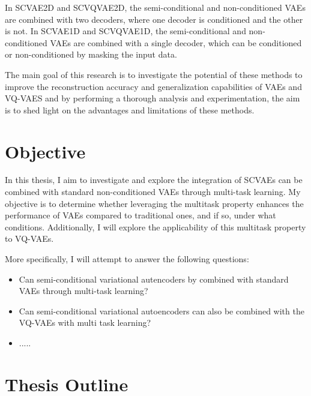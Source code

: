 In SCVAE2D and SCVQVAE2D, the semi-conditional and non-conditioned VAEs are combined with two decoders, where one decoder is conditioned and the other is not. In SCVAE1D and SCVQVAE1D, the semi-conditional and non-conditioned VAEs are combined with a single decoder, which can be conditioned or non-conditioned by masking the input data.

The main goal of this research is to investigate the potential of these methods to improve the reconstruction accuracy and generalization capabilities of VAEs and VQ-VAES and by performing a thorough analysis and experimentation, the aim is to shed light on the advantages and limitations of these methods.

\section{Objective}

In this thesis, I aim to investigate and explore the integration of SCVAEs can be combined with standard non-conditioned VAEs through multi-task learning. My objective is to determine whether leveraging the multitask property enhances the performance of VAEs compared to traditional ones, and if so, under what conditions. Additionally, I will explore the applicability of this multitask property to VQ-VAEs.

More specifically, I will attempt to answer the following questions:

\begin{itemize}
    \item Can semi-conditional variational autencoders by combined with standard VAEs through multi-task learning?
    \item Can semi-conditional variational autoencoders can also be combined with the VQ-VAEs with multi task learning?
    \item .....
\end{itemize}



\section{Thesis Outline}



